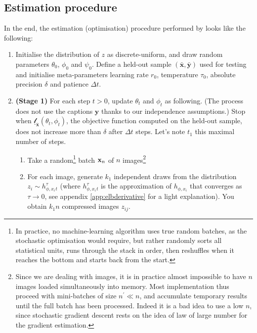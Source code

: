 \documentclass{article}
\begin{document}
\begin{appendix}
\begin{multicols}{2}
\clearpage

\subsection{Estimation procedure} \label{app:estimation}

In the end, the estimation (optimisation) procedure performed by \citet{zeroshot} looks like the following:

\newcommand{\zn}{\mathbf{z}_n}

\begin{enumerate}
    \item Initialise the distribution of $z$ as discrete-uniform, and draw random parameters $\theta_0$,  $\phi_0$ and $\psi_0$. Define a held-out sample $(\bar{\mathbf{x}},\bar{\mathbf{y}})$ used for testing and initialise meta-parameters learning rate $r_0$, temperature $\tau_0$, absolute precision $\delta$ and patience $\Delta t$.
    \item \textbf{(Stage 1)} For each step $t>0$, update $\theta_t$ and $\phi_t$ as following. (The process does not use the captions $\mathbf{y}$ thanks to our independence assumptions.) Stop when $\underline{\mathscr{l}}_{\bar{\mathbf{x}}}(\theta_t,\phi_t)$, the objective function computed on the held-out sample, does not increase more than $\delta$ after $\Delta t$ steps. Let's note $t_1$ this maximal number of steps.
    \begin{enumerate}
    \item Take a random\footnote{In practice, no machine-learning algorithm uses true random batches, as the stochastic optimisation would require, but rather randomly sorts all statistical units, runs through the stack in order, then reshuffles when it reaches the bottom and starts back from the start.} batch $\mathbf{x}_n$ of $n$ images\footnote{Since we are dealing with images, it is in practice almost impossible to have $n$ images loaded simultaneously into memory. Most implementation thus proceed with mini-batches of size $n^\prime\ll n$, and accumulate temporary results until the full batch has been processed. Indeed it is a bad idea to use a low $n$, since stochastic gradient descent rests on the idea of law of large number for the gradient estimation.}
    \item For each image, generate $k_1$ independent draws from the distribution $z_i\sim h_{\phi,x_i}^\tau_t$ (where $h_{\phi,x_i}^\tau_t$ is the approximation of $h_{\phi,x_i}$ that converges as $\tau \to 0$, see appendix \ref{app:elbderivative} for a light explanation). You obtain $k_1n$ compressed images $z_{ij}$.

\end{enumerate}
\end{enumerate}
\end{multicols}
\end{appendix}
\end{document}
